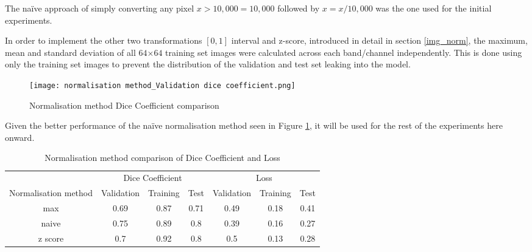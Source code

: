 The na\"ive approach of simply converting any pixel $x>10,000=10,000$ followed by $x=x/10,000$ was the one used for the initial experiments.

In order to implement the other two transformations $[0,1]$ interval and z-score, introduced in detail in section \ref{img_norm}, the maximum, mean and standard deviation of all $64$×$64$ training set images were calculated across each band/channel independently. This is done using only the training set images to prevent the distribution of the validation and test set leaking into the model.
\begin{figure}[hbt!]
    \centering
    \texttt{[image: normalisation method\_Validation dice coefficient.png]}
    \caption{Normalisation method Dice Coefficient comparison}
    \label{norm_dice}
\end{figure}

Given the better performance of the  na\"ive normalisation method seen in Figure \ref{norm_dice}, it will be used for the rest of the experiments here onward.
\begin{table}[ht!] 
    \begin{center}
    \begin{tabular}{ccccccc} 
    \toprule
       & \multicolumn{3}{c}{Dice Coefficient}     & \multicolumn{3}{c}{Loss} \\
    Normalisation method & Validation & Training & Test & Validation    & Training    & Test   \\ \midrule
    max & 0.69 & 0.87 & 0.71 & 0.49 & 0.18 & 0.41  \\ \rowcolor{lightgray} naive & 0.75 & 0.89 & 0.8 & 0.39 & 0.16 & 0.27  \\ z score & 0.7 & 0.92 & 0.8 & 0.5 & 0.13 & 0.28  \\

    \bottomrule
    \end{tabular}
  \end{center} 
  \caption{Normalisation method comparison of Dice Coefficient and Loss}\label{tab_norm}
\end{table}

